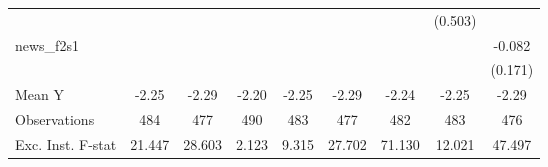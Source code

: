 {\begin{tabular}{l*{8}{c}}
            &                     &                     &                     &                     &                     &                     &     (0.503)         &                     \\
\addlinespace
news\_f2s1   &                     &                     &                     &                     &                     &                     &                     &      -0.082         \\
            &                     &                     &                     &                     &                     &                     &                     &     (0.171)         \\
\midrule
Mean Y      &       -2.25         &       -2.29         &       -2.20         &       -2.25         &       -2.29         &       -2.24         &       -2.25         &       -2.29         \\
Observations&         484         &         477         &         490         &         483         &         477         &         482         &         483         &         476         \\
Exc. Inst. F-stat&      21.447         &      28.603         &       2.123         &       9.315         &      27.702         &      71.130         &      12.021         &      47.497         \\
\bottomrule
\end{tabular}
}
